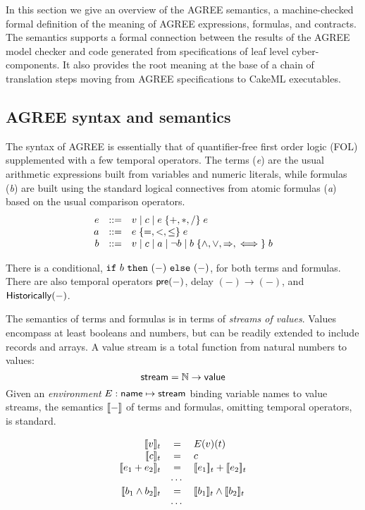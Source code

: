 In this section we give an overview of the AGREE semantics, a
machine-checked formal definition of the meaning of AGREE expressions,
formulas, and contracts. The semantics supports a formal connection
between the results of the AGREE model checker and code generated from
specifications of leaf level cyber-components. It also provides the root
meaning at the base of a chain of translation steps moving from AGREE
specifications to CakeML executables.


\subsection{AGREE syntax and semantics}
\label{agree-semantics}

The syntax of AGREE is essentially that of quantifier-free first order
logic (FOL) supplemented with a few temporal operators. The terms
(\emph{e}) are the usual arithmetic expressions built from variables
and numeric literals, while formulas (\emph{b}) are built using the
standard logical connectives from atomic formulas (\emph{a}) based on
the usual comparison operators.
\[
\begin{array}{rcl}
e & ::= & v \mid c \mid e \;\{ {+,*,/} \}\; e \\
a & ::= & e\; \{ {=,<,\leq} \}\; e \\
b & ::= & v \mid c \mid a \mid \neg b
            \mid b \; \{ {\land,\lor,\Rightarrow,\iff} \}\; b
\end{array}
\]

There is a conditional, $\mbox{$\mathtt{if}\ {b}\ \mathtt{then}\ {(-)}\ \mathtt{else}\ {(-)}$}$, for both terms and
formulas. There are also temporal operators $\mathsf{pre}(-)$, delay
$(-) \to (-)$, and $\mathsf{Historically}(-)$.

The semantics of terms and formulas is in terms of \emph{streams of
values}. Values encompass at least booleans and numbers, but can be
readily extended to include records and arrays. A value stream is a
total function from natural numbers to values:
\[
 \mathsf{stream} = \mathbb{N} \to \mathsf{value}
\]
Given an \emph{environment} $E : \mathsf{name} \mapsto \mathsf{stream}$
binding variable names to value streams, the semantics $[\![ - ]\!]$ of terms and
formulas, omitting temporal operators, is standard.

\[
\begin{array}{rcl}
\sem{v}_t & = & E(v)(t) \\
\sem{c}_t & = & c \\
\sem{e_1 + e_2}_t & = & \sem{e_1}_t + \sem{e_2}_t \\
   & \cdots & \\
\sem{b_1 \land b_2}_t & = & \sem{b_1}_t \land \sem{b_2}_t \\
   & \cdots & \\
\end{array}
\]
